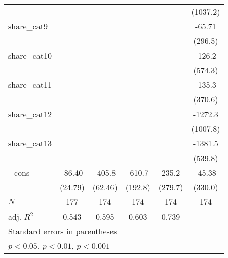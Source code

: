 {\begin{tabular}{l*{5}{c}}
            &                     &                     &                     &                     &    (1037.2)         \\
[1em]
share\_cat9  &                     &                     &                     &                     &      -65.71         \\
            &                     &                     &                     &                     &     (296.5)         \\
[1em]
share\_cat10 &                     &                     &                     &                     &      -126.2         \\
            &                     &                     &                     &                     &     (574.3)         \\
[1em]
share\_cat11 &                     &                     &                     &                     &      -135.3         \\
            &                     &                     &                     &                     &     (370.6)         \\
[1em]
share\_cat12 &                     &                     &                     &                     &     -1272.3         \\
            &                     &                     &                     &                     &    (1007.8)         \\
[1em]
share\_cat13 &                     &                     &                     &                     &     -1381.5\sym{*}  \\
            &                     &                     &                     &                     &     (539.8)         \\
[1em]
\_cons      &      -86.40\sym{***}&      -405.8\sym{***}&      -610.7\sym{**} &       235.2         &      -45.38         \\
            &     (24.79)         &     (62.46)         &     (192.8)         &     (279.7)         &     (330.0)         \\
\hline
\(N\)       &         177         &         174         &         174         &         174         &         174         \\
adj. \(R^{2}\)&       0.543         &       0.595         &       0.603         &       0.739         &                     \\
\hline\hline
\multicolumn{6}{l}{\footnotesize Standard errors in parentheses}\\
\multicolumn{6}{l}{\footnotesize \sym{*} \(p<0.05\), \sym{**} \(p<0.01\), \sym{***} \(p<0.001\)}\\
\end{tabular}
}
